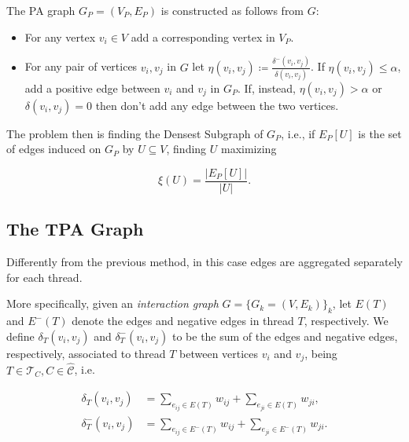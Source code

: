 \bigskip

The \acrfull{PA} graph $G_P = (V_{P}, E_{P}) $ is constructed as follows from
$G$:

\begin{itemize}
	\item For any vertex $v_{i} \in V$ add a corresponding vertex in $V_{P} $.
	\item For any pair of vertices $v_i, v_j$ in $G$ let $\eta(v_i,v_j)
		      \coloneqq \frac{\delta^{-} (v_i,v_j)}{\delta (v_i,v_j)} $. If
	      $\eta(v_i,v_j) \leq \alpha $, add a positive edge between $v_{i} $ and
	      $v_{j} $ in $G_{P} $. If, instead, $\eta(v_i,v_j) > \alpha $ or $\delta(v_{i}, v_{j}) =
		      0$ then don't add any edge between the two vertices.
\end{itemize}

The problem then is finding the Densest Subgraph of $G_P$, i.e., if $E_{P} [U]$
is the set of edges induced on $G_P$ by $U \subseteq V$, finding $U$ maximizing

\begin{equation}
	\xi(U) = \frac{|E_{P} [U]|}{|U|}.
\end{equation}

\subsection{The \acrlong{TPA} Graph}%
\label{ssub:the_tpa_graph}

Differently from the previous method, in this case edges are aggregated
separately for each thread.

\bigskip

More specifically, given an \emph{interaction graph} $G = \{G_k = (V,E_k) \}_k$,
let $E(T)$ and
$E^-(T)$ denote the edges and negative edges in thread $T$,
respectively. We define $\delta_{T}(v_{i}, v_{j})$ and
$\delta^{-} _{T}(v_{i}, v_{j})$ to be the sum of the edges and negative edges, respectively,
associated to thread $T$ between vertices $v_{i} $ and $v_{j} $, being $T \in
	\mathcal{T}_{C}, C \in \mathcal{\hat{C}}$, i.e.

\begin{align}
	\label{eq:}
	\delta_T(v_{i}, v_{j})   & = \sum^{}_{e_{ij} \in E(T)} w_{ij} + \sum^{}_{e_{ji} \in
	E(T)} w_{ji},
	\\
	\delta^-_T(v_{i}, v_{j}) & =  \sum^{}_{e_{ij} \in E^-(T)} w_{ij} + \sum^{}_{e_{ji} \in
	E^-(T)} w_{ji}.
\end{align}

